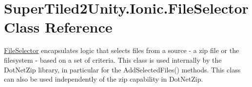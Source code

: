 \hypertarget{class_super_tiled2_unity_1_1_ionic_1_1_file_selector}{}\section{Super\+Tiled2\+Unity.\+Ionic.\+File\+Selector Class Reference}
\label{class_super_tiled2_unity_1_1_ionic_1_1_file_selector}


\mbox{\hyperlink{class_super_tiled2_unity_1_1_ionic_1_1_file_selector}{File\+Selector}} encapsulates logic that selects files from a source -\/ a zip file or the filesystem -\/ based on a set of criteria. This class is used internally by the Dot\+Net\+Zip library, in particular for the Add\+Selected\+Files() methods. This class can also be used independently of the zip capability in Dot\+Net\+Zip.  


